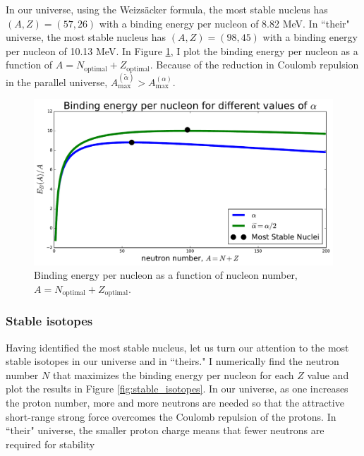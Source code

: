 \documentclass[%
 reprint,
 amsmath,amssymb,
 aps,
]{revtex4-1}
\begin{document}
In our universe, using the Weizs\"acker formula, the most stable nucleus has $(A, Z) = (57, 26)$ with a binding energy per nucleon of 8.82 MeV. In ``their" universe, the most stable nucleus has $(A, Z) = (98, 45)$ with a binding energy per nucleon of 10.13 MeV. In Figure \ref{fig:binding_energy}, I plot the binding energy per nucleon as a function of $A = N_\text{optimal} + Z_\text{optimal}$. Because of the reduction in Coulomb repulsion in the parallel universe, $A_\text{max}^{(\widetilde{\alpha})} > A_\text{max}^{(\alpha)}$.

\begin{figure}[h!]
	\centering
	\includegraphics[width=\linewidth]{fig/binding_energy.pdf}
	\caption{\label{fig:binding_energy}Binding energy per nucleon as a function of nucleon number, $A = N_\text{optimal} + Z_\text{optimal}$.}
\end{figure}

\subsubsection{\label{sec:stable_isotopes}Stable isotopes}

Having identified the most stable nucleus, let us turn our attention to the most stable isotopes in our universe and in ``theirs." I numerically find the neutron number $N$ that maximizes the binding energy per nucleon for each $Z$ value\cite{jupyter_notebook} and plot the results in Figure \ref{fig:stable_isotopes}. In our universe, as one increases the proton number, more and more neutrons are needed so that the attractive short-range strong force overcomes the Coulomb repulsion of the protons. In ``their" universe, the smaller proton charge means that fewer neutrons are required for stability
\end{document}
